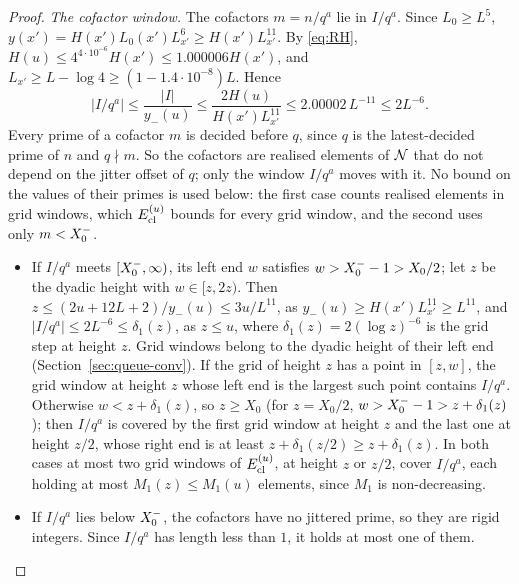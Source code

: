 \begin{proof}
\emph{The cofactor window.} The cofactors $m=n/q^a$ lie in $I/q^a$. Since $L_0\ge L^5$, $y(x')=H(x')L_0(x')L_{x'}^6\ge
H(x')L_{x'}^{11}$. By \eqref{eq:RH}, $H(u)\le4^{4\cdot10^{-6}}H(x')\le1.000006H(x')$, and $L_{x'}\ge L-\log4\ge(1-1.4\cdot10^{-8})L$.
Hence
\[
|I/q^a|\le\frac{|I|}{y_-(u)}\le\frac{2H(u)}{H(x')L_{x'}^{11}}\le2.00002\,L^{-11}\le2L^{-6}.
\]
Every prime of a cofactor $m$ is decided before $q$, since $q$ is the latest-decided prime of $n$ and $q\nmid m$. So the
cofactors are realised elements of $\mathcal{N}$ that do not depend on the jitter offset of $q$; only the window $I/q^a$ moves with
it. No bound on the values of their primes is used below: the first case counts realised elements in grid windows, which
$E_{\mathrm{cl}}^{(u)}$ bounds for every grid window, and the second uses only $m<X_0^{-}$.
\begin{itemize}
\item If $I/q^a$ meets $[X_0^{-},\infty)$, its left end $w$ satisfies $w>X_0^{-}-1>X_0/2$; let $z$ be the dyadic height with
  $w\in[z,2z)$. Then $z\le(2u+12L+2)/y_-(u)\le3u/L^{11}$, as $y_-(u)\ge H(x')L_{x'}^{11}\ge L^{11}$, and
  $|I/q^a|\le2L^{-6}\le\delta_1(z)$, as $z\le u$, where $\delta_1(z)=2(\log z)^{-6}$ is the grid step at height $z$. Grid windows belong to the dyadic height of
  their left end (Section~\ref{sec:queue-conv}). If the grid of height $z$ has a point in $[z,w]$, the grid window at
  height $z$ whose left end is the largest such point contains $I/q^a$. Otherwise $w<z+\delta_1(z)$, so $z\ge X_0$ (for $z=X_0/2$, $w>X_0^{-}-1>z+\delta_1(z)$); then
  $I/q^a$ is covered by the first grid window at height $z$ and the last one at height $z/2$, whose right end is at least
  $z+\delta_1(z/2)\ge z+\delta_1(z)$. In both cases at most two grid windows of $E_{\mathrm{cl}}^{(u)}$, at height $z$ or $z/2$, cover
  $I/q^a$, each holding at most $M_1(z)\le M_1(u)$ elements, since $M_1$ is non-decreasing.
\item If $I/q^a$ lies below $X_0^{-}$, the cofactors have no jittered prime, so they are rigid integers. Since $I/q^a$ has length
  less than $1$, it holds at most one of them. \qedhere
\end{itemize}
\end{proof}

